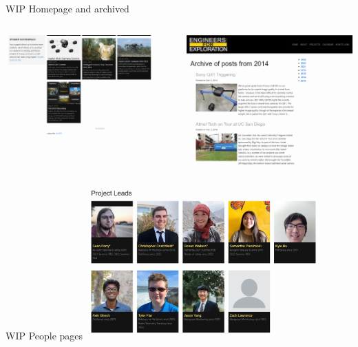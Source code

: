 \begin{frame}{WIP Homepage and archived}
    \begin{columns}
        \begin{column}{0.5\textwidth}
            \includegraphics[width=\linewidth]{images/homepage.png}
        \end{column}
        \begin{column}{0.5\textwidth}
            \includegraphics[width=\linewidth]{images/archive.png}
        \end{column}
    \end{columns}
\end{frame}

\begin{frame}{WIP People pages}
    \centering
    \includegraphics[height=0.7\textheight,width=0.7\textwidth,keepaspectratio]{images/People.png}
\end{frame}

